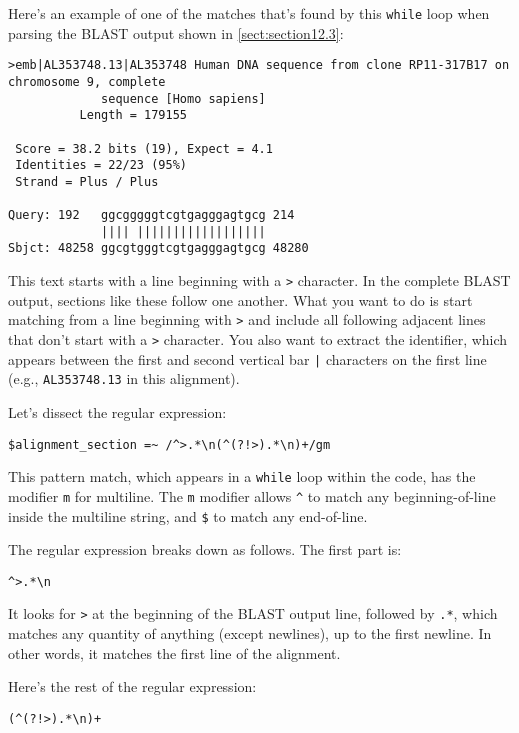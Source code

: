 Here's an example of one of the matches that's found by this \verb|while| loop when parsing the BLAST output shown in \autoref{sect:section12.3}:

\begin{lstlisting}
>emb|AL353748.13|AL353748 Human DNA sequence from clone RP11-317B17 on
chromosome 9, complete
             sequence [Homo sapiens]
          Length = 179155

 Score = 38.2 bits (19), Expect = 4.1
 Identities = 22/23 (95%)
 Strand = Plus / Plus

Query: 192   ggcgggggtcgtgagggagtgcg 214
             |||| ||||||||||||||||||
Sbjct: 48258 ggcgtgggtcgtgagggagtgcg 48280
\end{lstlisting}

This text starts with a line beginning with a \verb|>| character. In the complete BLAST output, sections like these follow one another. What you want to do is start matching from a line beginning with \verb|>| and include all following adjacent lines that don't start with a \verb|>| character. You also want to extract the identifier, which appears between the first and second vertical bar \verb=|= characters on the first line (e.g., \verb|AL353748.13| in this alignment). 

Let's dissect the regular expression:

\begin{lstlisting}
$alignment_section =~ /^>.*\n(^(?!>).*\n)+/gm
\end{lstlisting}

This pattern match, which appears in a \verb|while| loop within the code, has the modifier \verb|m| for multiline. The \verb|m| modifier allows \verb|^| to match any beginning-of-line inside the multiline string, and \verb|$| to match any end-of-line.

The regular expression breaks down as follows. The first part is:

\begin{lstlisting}
^>.*\n
\end{lstlisting}

It looks for \verb|>| at the beginning of the BLAST output line, followed by \verb|.*|, which matches any quantity of anything (except newlines), up to the first newline. In other words, it matches the first line of the alignment.

Here's the rest of the regular expression:

\begin{lstlisting}
(^(?!>).*\n)+
\end{lstlisting}

